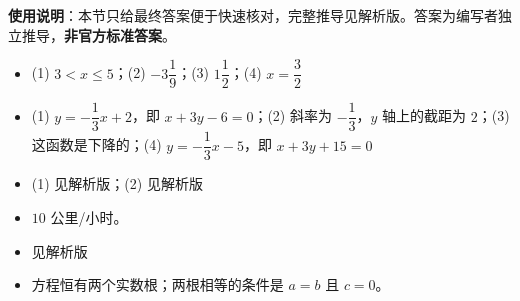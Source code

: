 
\begin{gknotice}
\textbf{使用说明}：本节只给最终答案便于快速核对，完整推导见解析版。答案为编写者独立推导，\textbf{非官方标准答案}。
\end{gknotice}

\begin{itemize}[leftmargin=2.6em]
  \item[\textbf{1.}] (1) $3<x\le5$；(2) $-3\dfrac19$；(3) $1\dfrac12$；(4) $x=\dfrac32$
  \item[\textbf{2.}] (1) $y=-\dfrac13x+2$，即 $x+3y-6=0$；(2) 斜率为 $-\dfrac13$，$y$ 轴上的截距为 $2$；(3) 这函数是下降的；(4) $y=-\dfrac13x-5$，即 $x+3y+15=0$
  \item[\textbf{3.}] (1) 见解析版；(2) 见解析版
  \item[\textbf{4.}] $10$ 公里/小时。
  \item[\textbf{5.}] 见解析版
  \item[\textbf{6.}] 方程恒有两个实数根；两根相等的条件是 $a=b$ 且 $c=0$。
\end{itemize}
